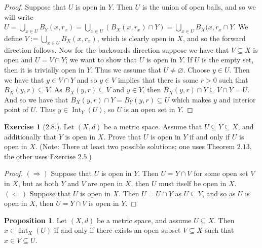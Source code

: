 \documentclass[9pt,reqno]{amsart}
\theoremstyle{definition}
\newtheorem{exercise}{Exercise}[section]
\newtheorem{prop}{Proposition}[section]
\DeclareMathOperator{\Int}{Int}
\begin{document}
\begin{proof}
	Suppose that $U$ is open in $Y$. Then $U$ is the union of open balls, and so we will write $U = \bigcup _{x \in U} B_Y(x, r_x)  = \bigcup _{x \in U} (B_X(x, r_x) \cap Y) = \bigcup _{x \in U} B_X(x, r_x \cap Y$. We define $V:= \bigcup _{x \in U} B_X(x, r_x)$, which is clearly open in $X$, and so the forward direction follows. Now for the backwards direction suppose we have that $V \subseteq X$ is open and $U = V \cap Y$; we want to show that $U$ is open in $Y$. If $U$ is the empty set, then it is trivially open in $Y$. Thus we assume that $U \neq \varnothing$. Choose $y \in U$. Then we have that $y \in V \cap Y$ and so $y \in V$ implies that there is some $r>0$ such that $B_X(y,r) \subseteq V$. As $B_X(y,r) \subseteq V$ and $y \in Y$, then $B_X(y,r) \cap Y \subseteq  V \cap Y = U$. And so we have that $B_X(y,r) \cap Y = B_Y(y,r)  \subseteq U$ which makes $y$ and interior point of $U$. Thus $y \in \Int _Y(U)$, so $U$ is an open set in $Y$.
\end{proof}

\begin{exercise}[2.8.] Let $(X, d)$ be a metric space. Assume that $U \subseteq Y \subseteq X$, and additionally that $Y$ is open in $X$. Prove that $U$ is open in $Y$ if and only if $U$ is open in $X$. (Note: There at least two possible solutions; one uses Theorem $2.13$, the other uses Exercise $2.5.$)
\end{exercise}
\begin{proof} $(\Rightarrow)$ Suppose that $U$ is open in $Y$. Then $U = Y \cap V$ for some open set $V$ in $X$, but as both $Y$ and $V$ are open in $X$, then $U$ must itself be open in $X$. $(\Leftarrow)$ Suppose that $U$ is open in $X$. Then $U = U \cap Y$ as $U \subseteq Y$, and so as $U$ is open in $X$, then $U = Y \cap V$ is open in $Y$.
\end{proof}

\begin{prop}
Let $(X,d)$ be a metric space, and assume $U \subseteq X$. Then $x \in \Int _X(U)$ if and only if there exists an open subset $V \subseteq X$ such that $x \in V \subseteq U$.
\end{prop}
\end{document}
